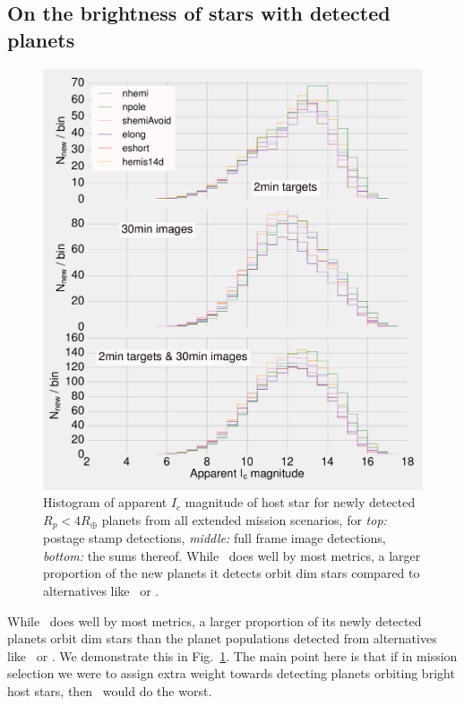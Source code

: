 \subsection{On the brightness of stars with detected planets}
\begin{figure}[!t]
	\centering
	\includegraphics[]{figures/160729_icmag_t50_all.pdf}
	\caption{Histogram of apparent $I_c$ magnitude of host star for newly detected $R_p<4R_\oplus$ planets from all extended mission scenarios, for \textit{top:} postage stamp detections, \textit{middle:} full frame image detections, \textit{bottom:} the sums thereof.
	While \npole\ does well by most metrics, a larger proportion of the new planets it detects orbit dim stars compared to alternatives like \hemis\ or \shemiAvoid.}
	\label{fig:icmag_meta}
\end{figure}
While \npole\ does well by most metrics, a larger proportion of its newly detected planets orbit dim stars than the planet populations detected from alternatives like \hemis\ or \shemiAvoid.
We demonstrate this in Fig.~\ref{fig:icmag_meta}.
The main point here is that if in mission selection we were to assign extra weight towards detecting planets orbiting bright host stars, then \npole\ would do the worst.
